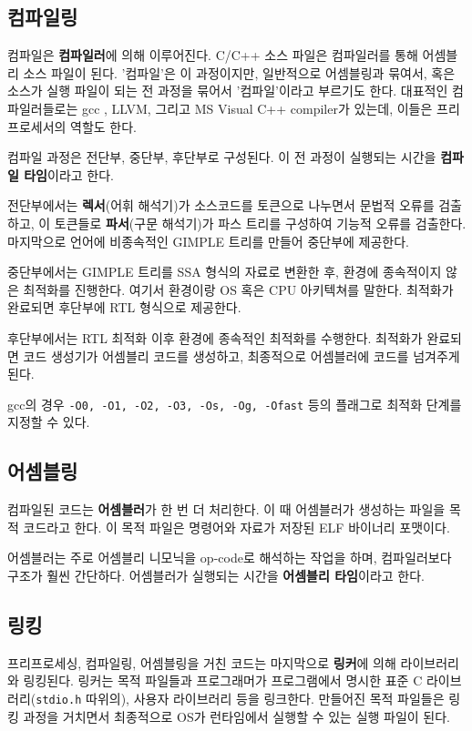\subsection{컴파일링}
컴파일은 \textbf{컴파일러}에 의해 이루어진다. C/C++ 소스 파일은 컴파일러를 통해 어셈블리 소스 파일이 된다. '컴파일'은 이 과정이지만, 일반적으로 어셈블링과 묶여서, 혹은 소스가 실행 파일이 되는 전 과정을 묶어서 '컴파일'이라고 부르기도 한다. 대표적인 컴파일러들로는 gcc , LLVM, 그리고 MS Visual C++ compiler가 있는데, 이들은 프리프로세서의 역할도 한다.

컴파일 과정은 전단부, 중단부, 후단부로 구성된다. 이 전 과정이 실행되는 시간을 \textbf{컴파일 타임}이라고 한다.

전단부에서는 \textbf{렉서}(어휘 해석기)가 소스코드를 토큰으로 나누면서 문법적 오류를 검출하고, 이 토큰들로 \textbf{파서}(구문 해석기)가 파스 트리를 구성하여 기능적 오류를 검출한다. 마지막으로 언어에 비종속적인 GIMPLE 트리를 만들어 중단부에 제공한다.

중단부에서는 GIMPLE 트리를 SSA 형식의 자료로 변환한 후, 환경에 종속적이지 않은 최적화를 진행한다. 여기서 환경이랑 OS 혹은 CPU 아키텍쳐를 말한다. 최적화가 완료되면 후단부에 RTL 형식으로 제공한다.

후단부에서는 RTL 최적화 이후 환경에 종속적인 최적화를 수행한다. 최적화가 완료되면 코드 생성기가 어셈블리 코드를 생성하고, 최종적으로 어셈블러에 코드를 넘겨주게 된다.

gcc의 경우 \texttt{-O0, -O1, -O2, -O3, -Os, -Og, -Ofast} 등의 플래그로 최적화 단계를 지정할 수 있다.

\subsection{어셈블링}
컴파일된 코드는 \textbf{어셈블러}가 한 번 더 처리한다. 이 때 어셈블러가 생성하는 파일을 목적 코드라고 한다. 이 목적 파일은 명령어와 자료가 저장된 ELF 바이너리 포맷이다. 

어셈블러는 주로 어셈블리 니모닉을 op-code로 해석하는 작업을 하며, 컴파일러보다 구조가 훨씬 간단하다. 어셈블러가 실행되는 시간을 \textbf{어셈블리 타임}이라고 한다.

\subsection{링킹}
프리프로세싱, 컴파일링, 어셈블링을 거친 코드는 마지막으로 \textbf{링커}에 의해 라이브러리와 링킹된다. 링커는 목적 파일들과 프로그래머가 프로그램에서 명시한 표준 C 라이브러리(\texttt{stdio.h} 따위의), 사용자 라이브러리 등을 링크한다. 만들어진 목적 파일들은 링킹 과정을 거치면서 최종적으로 OS가 런타임에서 실행할 수 있는 실행 파일이 된다.


